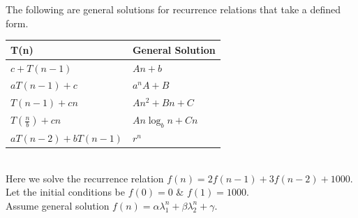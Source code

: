 \documentclass[11pt,a4paper]{article}
\begin{document}
The following are general solutions for recurrence relations that take a defined form.\\
\begin{tabular}{|l|l|}
\hline
T(n)&General Solution\\
\hline
$c+T(n-1)$&$An+b$\\
$aT(n-1)+c$&$a^nA+B$\\
$T(n-1)+cn$&$An^2+Bn+C$\\
$T(\frac{n}{b})+cn$&$An\log_bn+Cn$\\
$aT(n-2)+bT(n-1)$&$r^n$\\
\hline
\end{tabular}
\\

\newpage
{}
Here we solve the recurrence relation $f(n)=2f(n-1)+3f(n-2)+1000$.\\
Let the initial conditions be $f(0)=0$ \& $f(1)=1000$.\\
Assume general solution $f(n)=\alpha \lambda_1^n+\beta\lambda_2^n+\gamma$.
\end{document}
